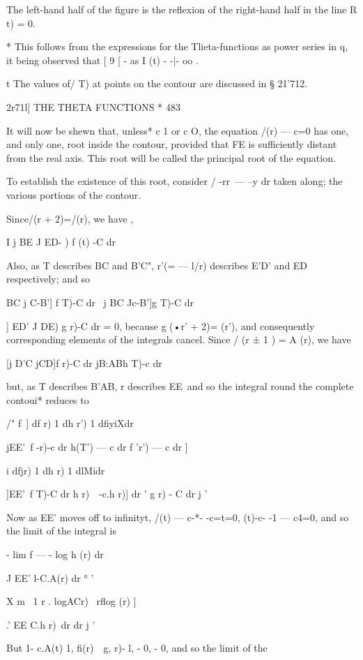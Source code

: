 The left-hand half of the figure is the reflexion of the right-hand half in the line 
R t) = 0. 

* This follows from the expressions for the Tlieta-functions as power series in q, it being 
observed that [ 9 [ -  as I (t)  - -|- oo . 

t The values of/ T) at points on the contour are discussed in § 21'712. 



2r71l] THE THETA FUNCTIONS * 483 

It will now be shewn that, unless* c  1 or c O, the equation /(r) — c=0 has one, and 
only one, root inside the contour, provided that FE is sufficiently distant from the real 
axis. This root will be called the principal root of the equation. 

To establish the existence of this root, consider / -rr\ — --y  dr taken along; the 
various portions of the contour. 

Since/(r + 2)=/(r), we have , 

I j BE J ED- ) f (t) -C dr 

Also, as T describes BC and B'C", r'(= — l/r) describes E'D' and ED respectively; 
and so 

   BC j C-B'] f T)-C dr \ j BC Jc-B']g T)-C dr 

 ] ED' J DE) g r)-C dr 
= 0, 
because g (•r' + 2)= (r'), and consequently corresponding elements of the integrals cancel. 
Since / (r ± 1 ) = A (r), we have   

[j D'C jCD]f r)-C dr jB:ABh T)-c dr 

but, as T describes B'AB, r describes EE\ and so the integral round the complete contoui* 
reduces to 

/" f\ ] df r)   1 dh r')   1 dfiyiXdr 

jEE'\ f -r)-c dr h(T') — c dr f 'r') — c dr ] 

 i    dfjr) 1 dh r) 1 dlMidr 

]EE'\ f T)-C dr h r)\ \ -c.h r)] dr '  g  r) - C dr j ' 

Now as EE' moves off to infinityt, /(t) — c-*- -c=t=0,  (t)-c- -1 — c4=0, and so the 
limit of the integral is 

- lim f  —   -   log h (r)  dr 

J EE' l-C.A(r) dr  °   '  

 X m \ 1 r . logACr) \  rflog (r) ]   

.' EE  C.h r)\ dr dr j ' 

But 1- c.A(t) 1, fi(r)~ \,g, r)- l,   - 0,  - 0, and so the limit of the 

